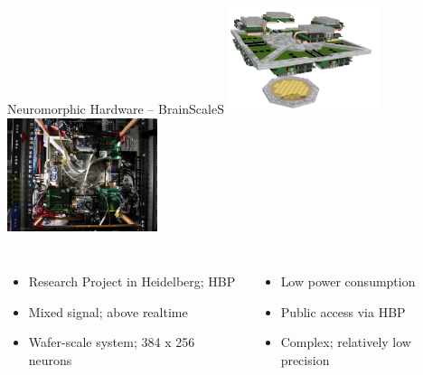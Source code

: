 \documentclass[handout,aspectratio=169]{beamer}
\begin{document}
\begin{frame}{Neuromorphic Hardware -- BrainScaleS}
	\vspace{0.45cm}
	\centering
	\includegraphics[width=0.33\textwidth]{media/brain_scales.png}\hspace{0.5cm}%
	\includegraphics[width=0.33\textwidth]{media/brainscales_system1_small.jpg}\\[0.5cm]
	\begin{columns}
		\begin{itemize}
			\setlength{\itemsep}{0.25cm}
			\item Research Project in Heidelberg; HBP
			\item Mixed signal; above realtime
			\item Wafer-scale system; 384 x 256 neurons
		\end{itemize}
		\begin{itemize}
			\setlength{\itemsep}{0.25cm}
			\item<2->[\OPlus] Low power consumption
			\item<2->[\OPlus] Public access via HBP
			\item<2->[\OMinus] Complex; relatively low precision
		\end{itemize}
	\end{columns}
	\vspace{1cm}
\end{frame}
\end{document}
